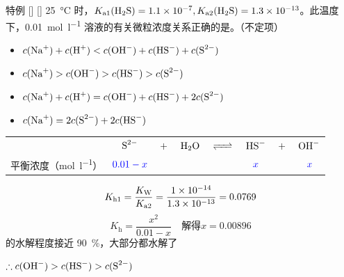     \begin{xmp}
        [专题——溶液中的微粒浓度比较特例]
        {特例}
        []
        []
        \SI{25}{\celsius} 时，\(K_{\text{a}1}(\cemh{H2S}) = \num{1.1E-7}, K_{\text{a}2}(\cemh{H2S}) = \num{1.3E-13}\)。此温度下，\SI{0.01}{\mole\per\litre}  溶液的有关微粒浓度关系正确的是\uline{}。（不定项）

        \begin{itemize}
            \item[A.] \(c(\cemh{Na+}) + c(\cemh{H+}) < c(\cemh{OH^-}) + c(\cemh{HS^-}) + c(\cemh{S^2-})\)
            \item[B.] \(c(\cemh{Na+}) > c(\cemh{OH^-}) > c(\cemh{HS^-}) > c(\cemh{S^2-})\)
            \item[C.] \(c(\cemh{Na+}) + c(\cemh{H+}) = c(\cemh{OH^-}) + c(\cemh{HS^-}) + 2c(\cemh{S^2-})\)
            \item[D.] \(c(\cemh{Na+}) = 2c(\cemh{S^2-}) + 2c(\cemh{HS^-})\)
        \end{itemize}

        \vspace{0.5\baselineskip}

        \begin{tabular}{r@{\quad}c@{}c@{}c@{}c@{}c@{}c@{}c}
            & \(\mathbf{\cemh{S^2-}} \) & \(\mathbf{\cemh{+}}\)  & \(\mathbf{\cemh{H2O}}\)  & \(\mathbf{\cemh{<=>}} \) & \(\mathbf{\cemh{HS^-}} \) & \(\mathbf{\cemh{+}} \) & \(\mathbf{\cemh{OH^-}} \) \\
            平衡浓度（\si{\mole\per\litre}） & \(\mathcolor{blue}{0.01-x}\) &&&& \(\mathcolor{blue}{x}\) && \(\mathcolor{blue}{x}\) \\
        \end{tabular}

        \[
            K_{\text{h}1} = \frac{K_\text{W}}{K_{\text{a}2}} = \frac{\num{1E-14}}{\num{1.3E-13}} = 0.0769
        \]
        \[
            K_\text{h} = \frac{x^2}{0.01 - x} \quad \text{解得} x= 0.00896
        \]
         的水解程度接近 \SI{90}{\percent}，大部分都水解了

        \(\therefore c(\cemh{OH^-}) > c(\cemh{HS^-}) > c(\cemh{S^2-})\)
    \end{xmp}
